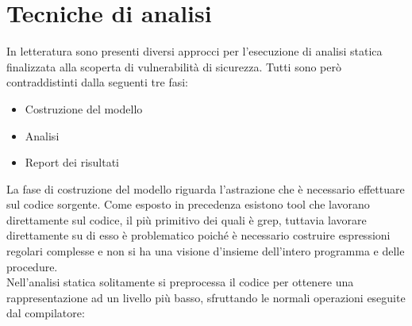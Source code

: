 \section{Tecniche di analisi}
In letteratura sono presenti diversi approcci per l'esecuzione di analisi statica finalizzata alla scoperta di vulnerabilità di sicurezza. Tutti sono però contraddistinti dalla seguenti tre fasi:
\begin{itemize}
\item Costruzione del modello
\item Analisi
\item Report dei risultati
\end{itemize}

La fase di costruzione del modello riguarda l'astrazione che è necessario effettuare sul codice sorgente. Come esposto in precedenza esistono tool che lavorano direttamente sul codice, il più primitivo dei quali è grep, tuttavia lavorare direttamente su di esso è problematico poiché è necessario costruire espressioni regolari complesse e non si ha una visione d'insieme dell'intero programma e delle procedure.\\
Nell'analisi statica solitamente si preprocessa il codice per ottenere una rappresentazione ad un livello più basso, sfruttando le normali operazioni eseguite dal compilatore:
